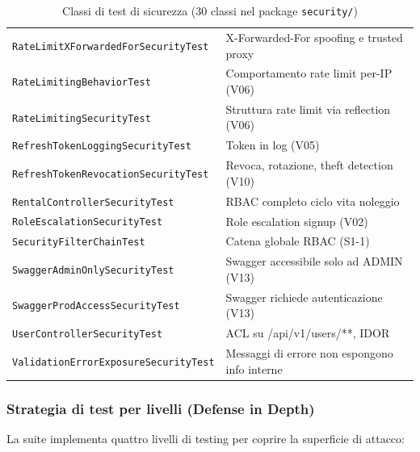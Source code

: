 \documentclass[12pt, a4paper]{article}
\begin{document}
\begin{table}[H]
\begin{tabular}{|p{8cm}|p{10cm}|}
            \texttt{RateLimitXForwardedForSecurityTest} & X-Forwarded-For spoofing e trusted proxy \\
            \texttt{RateLimitingBehaviorTest} & Comportamento rate limit per-IP (V06) \\
            \texttt{RateLimitingSecurityTest} & Struttura rate limit via reflection (V06) \\
            \texttt{RefreshTokenLoggingSecurityTest} & Token in log (V05) \\
            \texttt{RefreshTokenRevocationSecurityTest} & Revoca, rotazione, theft detection (V10) \\
            \texttt{RentalControllerSecurityTest} & RBAC completo ciclo vita noleggio \\
            \texttt{RoleEscalationSecurityTest} & Role escalation signup (V02) \\
            \texttt{SecurityFilterChainTest} & Catena globale RBAC (S1-1) \\
            \texttt{SwaggerAdminOnlySecurityTest} & Swagger accessibile solo ad ADMIN (V13) \\
            \texttt{SwaggerProdAccessSecurityTest} & Swagger richiede autenticazione (V13) \\
            \texttt{UserControllerSecurityTest} & ACL su /api/v1/users/**, IDOR \\
            \texttt{ValidationErrorExposureSecurityTest} & Messaggi di errore non espongono info interne \\
            \hline
        \end{tabular}
        \caption{Classi di test di sicurezza (30 classi nel package \texttt{security/})}
        \label{tab:security_test_classes}
    \end{table}

    \subsubsection{Strategia di test per livelli (Defense in Depth)}

    La suite implementa quattro livelli di testing per coprire la superficie di attacco:
\end{document}
